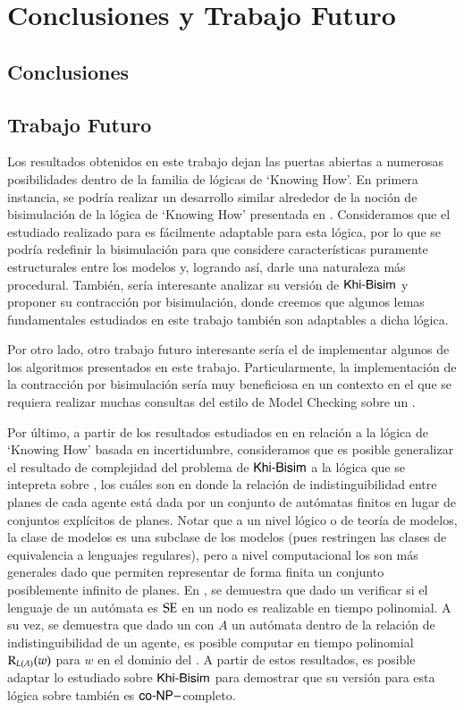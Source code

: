 \chapter{Conclusiones y Trabajo Futuro}

\section{Conclusiones}


\section{Trabajo Futuro}

Los resultados obtenidos en este trabajo dejan las puertas abiertas a numerosas posibilidades dentro de la familia de lógicas de `Knowing How'. 
En primera instancia, se podría realizar un desarrollo similar alrededor de la noción de bisimulación de la lógica de `Knowing How' presentada 
en \cite{Wang15KH,Wang2018GoalDirectedKH}. Consideramos que el estudiado realizado para \KHilogic es fácilmente adaptable para esta lógica, por lo que se podría
redefinir la bisimulación para que considere características puramente estructurales entre los modelos y, logrando así, darle una naturaleza más procedural. 
También, sería interesante analizar su versión de $\rm\textsf{Khi-Bisim}$ y proponer su contracción por bisimulación, 
donde creemos que algunos lemas fundamentales estudiados en este trabajo también son adaptables a dicha lógica.

Por otro lado, otro trabajo futuro interesante sería el de implementar algunos de los algoritmos presentados en este trabajo. Particularmente, 
la implementación de la contracción por bisimulación sería muy beneficiosa en un contexto en el que se requiera realizar muchas consultas del 
estilo de Model Checking sobre un \ults.

Por último, a partir de los resultados estudiados en \cite{Demri_Fervari_2023} en relación a la lógica de `Knowing How' basada en incertidumbre, 
consideramos que es posible generalizar el resultado de complejidad del problema de $\rm\textsf{Khi-Bisim}$ a la lógica que se intepreta sobre \regults, los 
cuáles son \ults en donde la relación de indistinguibilidad entre planes de cada agente está dada por un conjunto de autómatas finitos en lugar 
de conjuntos explícitos de planes. 
Notar que a un nivel lógico o de teoría de modelos, la clase de modelos \regults es una subclase de los modelos \ults (pues restringen las clases de equivalencia 
a lenguajes regulares), pero a nivel computacional los \regults son más generales dado que permiten representar de forma finita un conjunto 
posiblemente infinito de planes. En \cite{Demri_Fervari_2023}, se demuestra que dado un \regults verificar si el lenguaje de un autómata 
es $\mathrm{SE}$ en un nodo es realizable en tiempo polinomial. A su vez, se demuestra que dado un \regults con $A$ un autómata dentro de la relación de indistinguibilidad de 
un agente, es posible computar en tiempo polinomial $\mathrm{R}_{L(A)}(w)$ para $w$ en el dominio del \regults.
A partir de estos resultados, es posible adaptar lo estudiado sobre $\rm\textsf{Khi-Bisim}$ para demostrar que su versión para 
esta lógica sobre \regults también es $\rm\textsf{co-NP}-$completo.